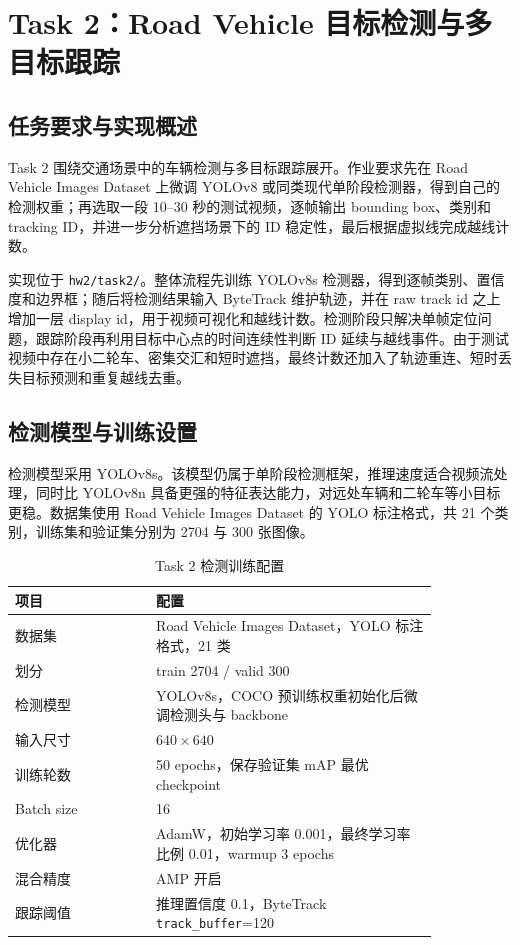 \documentclass[lang=cn,a4paper,newtx,code=minted]{elegantpaper}
\begin{document}
\section{Task 2：Road Vehicle 目标检测与多目标跟踪}

\subsection{任务要求与实现概述}

Task 2 围绕交通场景中的车辆检测与多目标跟踪展开。作业要求先在 Road Vehicle Images Dataset 上微调 YOLOv8 或同类现代单阶段检测器，得到自己的检测权重；再选取一段 10--30 秒的测试视频，逐帧输出 bounding box、类别和 tracking ID，并进一步分析遮挡场景下的 ID 稳定性，最后根据虚拟线完成越线计数。

实现位于 \texttt{hw2/task2/}。整体流程先训练 YOLOv8s 检测器，得到逐帧类别、置信度和边界框；随后将检测结果输入 ByteTrack 维护轨迹，并在 raw track id 之上增加一层 display id，用于视频可视化和越线计数。检测阶段只解决单帧定位问题，跟踪阶段再利用目标中心点的时间连续性判断 ID 延续与越线事件。由于测试视频中存在小二轮车、密集交汇和短时遮挡，最终计数还加入了轨迹重连、短时丢失目标预测和重复越线去重。

\subsection{检测模型与训练设置}

检测模型采用 YOLOv8s。该模型仍属于单阶段检测框架，推理速度适合视频流处理，同时比 YOLOv8n 具备更强的特征表达能力，对远处车辆和二轮车等小目标更稳。数据集使用 Road Vehicle Images Dataset 的 YOLO 标注格式，共 21 个类别，训练集和验证集分别为 2704 与 300 张图像。

\begin{table}[!htbp]
\centering
\small
\caption{Task 2 检测训练配置}
\label{tab:task2-config}
\begin{tabular}{@{}L{0.28\linewidth}L{0.56\linewidth}@{}}
\toprule
项目 & 配置 \\
\midrule
数据集 & Road Vehicle Images Dataset，YOLO 标注格式，21 类 \\
划分 & train 2704 / valid 300 \\
检测模型 & YOLOv8s，COCO 预训练权重初始化后微调检测头与 backbone \\
输入尺寸 & $640\times640$ \\
训练轮数 & 50 epochs，保存验证集 mAP 最优 checkpoint \\
Batch size & 16 \\
优化器 & AdamW，初始学习率 0.001，最终学习率比例 0.01，warmup 3 epochs \\
混合精度 & AMP 开启 \\
跟踪阈值 & 推理置信度 0.1，ByteTrack \texttt{track\_buffer}=120 \\
\bottomrule
\end{tabular}
\end{table}
\end{document}
